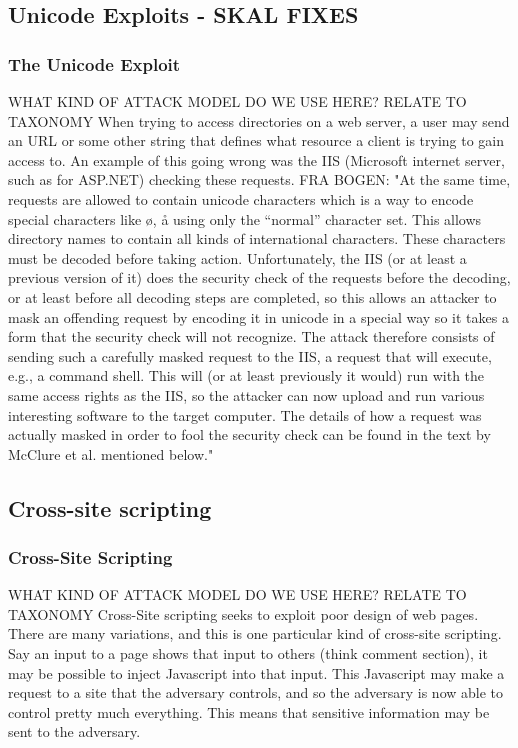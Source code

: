 \documentclass[14pt]{beamer}
\begin{document}
    \subsection{Unicode Exploits - SKAL FIXES}
        \begin{frame}
            \frametitle{The Unicode Exploit}
                WHAT KIND OF ATTACK MODEL DO WE USE HERE? RELATE TO TAXONOMY
                When trying to access directories on a web server, a user may send an URL or some other string that defines what resource a client is trying to gain access to. An example of this going wrong was the IIS (Microsoft internet server, such as for ASP.NET) checking these requests. 
                FRA BOGEN:
                "At the same time, requests are allowed to contain unicode characters which is a way to encode special characters like ø, å using only the “normal” character set. This allows directory names to contain all kinds of international characters. These characters must be decoded before taking action. Unfortunately, the IIS (or at least a previous version of it) does the security check of the requests before the decoding, or at least before all decoding steps are completed, so this allows an attacker to mask an offending request by encoding it in unicode in a special way so it takes a form that the security check will not recognize. The attack therefore consists of sending such a carefully masked request to the IIS, a request that will execute, e.g., a command shell. This will (or at least previously it would) run with the same access rights as the IIS, so the attacker can now upload and run various interesting software to the target computer.
                The details of how a request was actually masked in order to fool the security check can be found in the text by McClure et al. mentioned below."
        \end{frame}
\subsection{Cross-site scripting}
        \begin{frame}
            \frametitle{Cross-Site Scripting}
                WHAT KIND OF ATTACK MODEL DO WE USE HERE? RELATE TO TAXONOMY
                Cross-Site scripting seeks to exploit poor design of web pages. There are many variations, and this is one particular kind of cross-site scripting. Say an input to a page shows that input to others (think comment section), it may be possible to inject Javascript into that input. This Javascript may make a request to a site that the adversary controls, and so the adversary is now able to control pretty much everything. This means that sensitive information may be sent to the adversary.  
        \end{frame}
\end{document}
